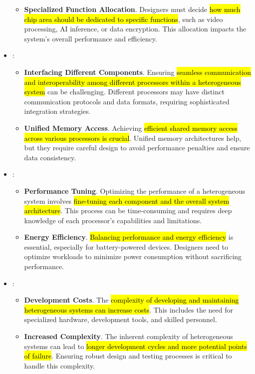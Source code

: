\begin{itemize}
\begin{itemize}
        \item \textbf{Specialized Function Allocation}. Designers must decide \hl{how much chip area should be dedicated to specific functions}, such as video processing, AI inference, or data encryption. This allocation impacts the system's overall performance and efficiency.
    \end{itemize}

    \item {}:
    \begin{itemize}
        \item \textbf{Interfacing Different Components}. Ensuring \hl{seamless communication and interoperability among different processors within a heterogeneous system} can be challenging. Different processors may have distinct communication protocols and data formats, requiring sophisticated integration strategies.
        
        \item \textbf{Unified Memory Access}. Achieving \hl{efficient shared memory access across various processors is crucial}. Unified memory architectures help, but they require careful design to avoid performance penalties and ensure data consistency.
    \end{itemize}

    \newpage

    \item {}:
    \begin{itemize}
        \item \textbf{Performance Tuning}. Optimizing the performance of a heterogeneous system involves \hl{fine-tuning each component and the overall system architecture}. This process can be time-consuming and requires deep knowledge of each processor's capabilities and limitations.

        \item \textbf{Energy Efficiency}. \hl{Balancing performance and energy efficiency} is essential, especially for battery-powered devices. Designers need to optimize workloads to minimize power consumption without sacrificing performance.
    \end{itemize}

    \item {}:
    \begin{itemize}
        \item \textbf{Development Costs}. The \hl{complexity of developing and maintaining heterogeneous systems can increase costs}. This includes the need for specialized hardware, development tools, and skilled personnel.

        \item \textbf{Increased Complexity}. The inherent complexity of heterogeneous systems can lead to \hl{longer development cycles and more potential points of failure}. Ensuring robust design and testing processes is critical to handle this complexity.
    \end{itemize}
\end{itemize}

